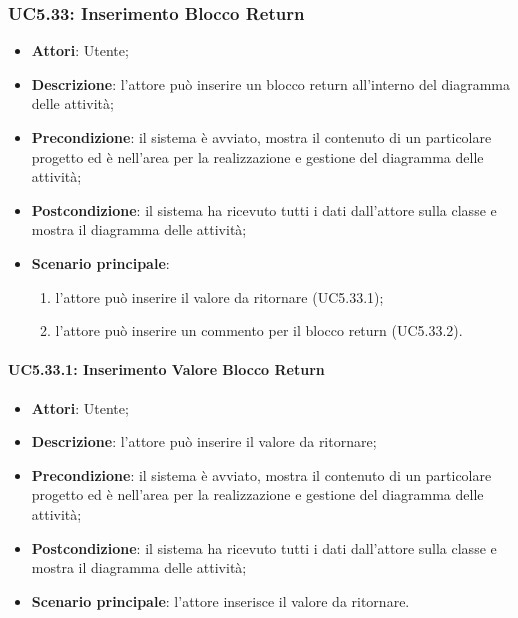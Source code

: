 \subsubsection{UC5.33: Inserimento Blocco Return}
\label{UC5.33}
\begin{itemize}
	\item \textbf{Attori}: Utente;
	\item \textbf{Descrizione}: l'attore può inserire un blocco return all'interno del diagramma delle attività;
	\item \textbf{Precondizione}: il sistema è avviato, mostra il contenuto di un particolare progetto ed è nell'area per la realizzazione e gestione del diagramma delle attività;
	\item \textbf{Postcondizione}: il sistema ha ricevuto tutti i dati dall'attore sulla classe e mostra il diagramma delle attività;
	\item \textbf{Scenario principale}:
		\begin{enumerate}
		\item l'attore può inserire il valore da ritornare (UC5.33.1);
		\item l'attore può inserire un commento per il blocco return (UC5.33.2).
		\end{enumerate}
\end{itemize}

\paragraph{UC5.33.1: Inserimento Valore Blocco Return}
\label{UC5.33.1}
\begin{itemize}
	\item \textbf{Attori}: Utente;
	\item \textbf{Descrizione}: l'attore può inserire il valore da ritornare;
	\item \textbf{Precondizione}: il sistema è avviato, mostra il contenuto di un particolare progetto ed è nell'area per la realizzazione e gestione del diagramma delle attività;
	\item \textbf{Postcondizione}: il sistema ha ricevuto tutti i dati dall'attore sulla classe e mostra il diagramma delle attività;
	\item \textbf{Scenario principale}: l'attore inserisce il valore da ritornare.
\end{itemize}

